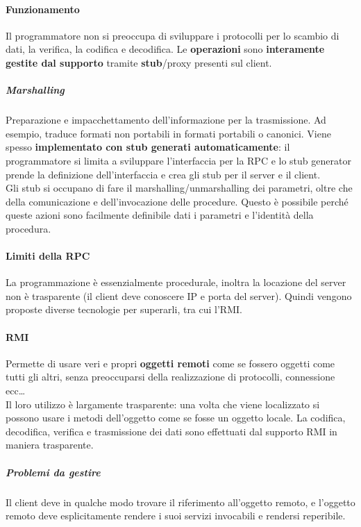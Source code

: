 \documentclass[10pt]{article}
\begin{document}
\paragraph{Funzionamento} Il programmatore non si preoccupa di sviluppare i protocolli per lo scambio di dati, la verifica, la codifica e decodifica. Le \textbf{operazioni} sono \textbf{interamente gestite dal supporto} tramite \textbf{stub}/proxy presenti sul client.
\subparagraph{Marshalling} Preparazione e impacchettamento dell'informazione per la trasmissione. Ad esempio, traduce formati non portabili in formati portabili o canonici. Viene spesso \textbf{implementato con stub generati automaticamente}: il programmatore si limita a sviluppare l'interfaccia per la RPC e lo stub generator prende la definizione dell'interfaccia e crea gli stub per il server e il client.\\
Gli stub si occupano di fare il marshalling/unmarshalling dei parametri, oltre che della comunicazione e dell'invocazione delle procedure. Questo è possibile perché queste azioni sono facilmente definibile dati i parametri e l'identità della procedura.
\paragraph{Limiti della RPC} La programmazione è essenzialmente procedurale, inoltra la locazione del server non è trasparente (il client deve conoscere IP e porta del server). Quindi vengono proposte diverse tecnologie per superarli, tra cui l'RMI.
\paragraph{RMI} Permette di usare veri e propri \textbf{oggetti remoti} come se fossero oggetti come tutti gli altri, senza preoccuparsi della realizzazione di protocolli, connessione ecc\ldots\\
Il loro utilizzo è largamente trasparente: una volta che viene localizzato si possono usare i metodi dell'oggetto come se fosse un oggetto locale. La codifica, decodifica, verifica e trasmissione dei dati sono effettuati dal supporto RMI in maniera trasparente.
\subparagraph{Problemi da gestire} Il client deve in qualche modo trovare il riferimento all'oggetto remoto, e l'oggetto remoto deve esplicitamente rendere i suoi servizi invocabili e rendersi reperibile.
\end{document}

